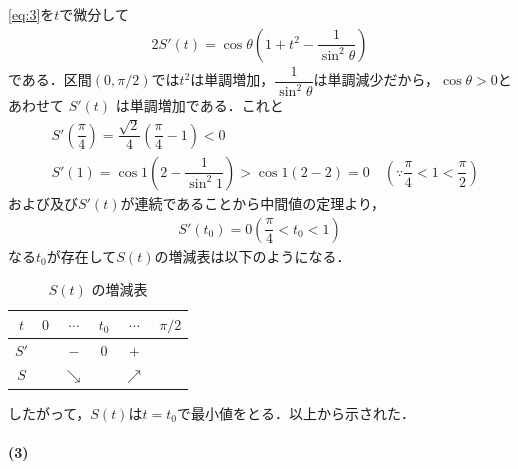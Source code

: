 \documentclass[../../main.tex]{subfiles}
\begin{document}
\cref{eq:3}を$t$で微分して
\begin{align}
  2S'(t) = \cos\theta \left(1+t^2-\dfrac{1}{\sin^2\theta}\right) \label{eq:4}
\end{align}
である．区間$(0,\pi/2)$では$t^2$は単調増加，$\dfrac{1}{\sin^2\theta}$は単調減少だから，$\cos\theta > 0$とあわせて $S'(t)$ は単調増加である．これと
\begin{align}
  & S'(\dfrac{\pi}{4}) = \dfrac{\sqrt{2}}{4}(\dfrac{\pi}{4}-1) < 0 \\
  & S'(1) = \cos 1 (2 - \dfrac{1}{\sin^2 1}) > \cos 1 (2-2) = 0 \quad (\because \dfrac{\pi}{4} < 1 < \dfrac{\pi}{2})
\end{align}
および及び$S'(t)$が連続であることから中間値の定理より，
\begin{align}
  S'(t_0) = 0 (\dfrac{\pi}{4} < t_0 < 1)
\end{align}
なる$t_0$が存在して$S(t)$の増減表は以下のようになる．

\begin{table}[htb]
  \centering
  \caption{$S(t)$ の増減表}
  \begin{tabular}{|c|c|c|c|c|c|}
    \hline
    $t$ & $0$ & $\cdots$ & $t_0$ & $\cdots$ & $\pi/2$ \\ \hline
    $S'$ & & $-$ & $0$ & $+$ & \\ \hline
    $S$ & & $\searrow$ & & $\nearrow$ & \\ \hline
  \end{tabular}
\end{table}

したがって，$S(t)$は$t=t_0$で最小値をとる．以上から示された．

\paragraph{(3)}
\end{document}
